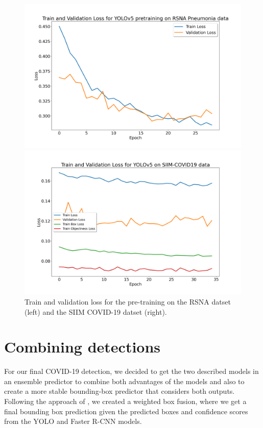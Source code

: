 \begin{figure}[h]
	\centering
	\begin{minipage}{.5\textwidth}
		\centering
		\includegraphics[width=\linewidth]{img/loss_yolo_30.png}
	\end{minipage}%
	\begin{minipage}{0.5\textwidth}
		\centering
		\includegraphics[width=\linewidth]{img/loss_yolo_35_siim_final.png}
	\end{minipage}
\caption{Train and validation loss for the pre-training on the RSNA datset (left) and the SIIM COVID-19 datset (right).}
\label{fig:yolo_losses}
\end{figure}


\section{Combining detections}\label{section:combining_detections}
For our final COVID-19 detection, we decided to get the two described models in an ensemble predictor to combine both advantages of the models and also to create a more stable bounding-box predictor that considers both outputs. Following the approach of \citeauthor{weightedBoxFusion} \autocite{weightedBoxFusion}, we created a weighted box fusion, where we get a final bounding box prediction given the predicted boxes and confidence scores from the \ac{YOLO} and Faster \ac{R-CNN} models.

